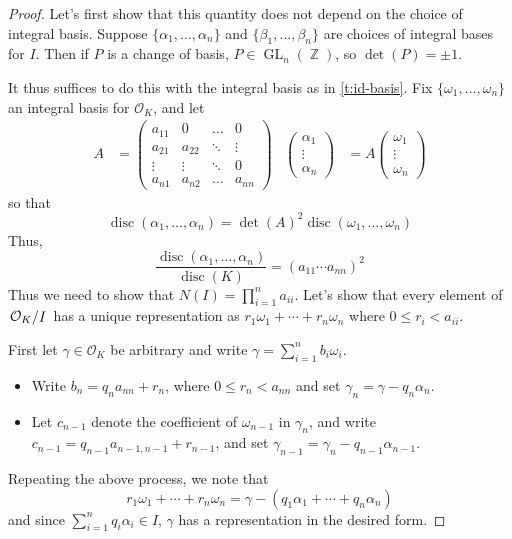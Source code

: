 \documentclass[11pt, a4paper]{memoir}
\DeclareMathOperator{\Z}{{\mathbb{Z}}}
\theoremstyle{change}
\theoremstyle{plain}
\theoremstyle{nonumberplain}
\newtheorem{proof}{Proof}
\DeclareMathOperator{\disc}{disc}
\DeclareMathOperator{\GL}{GL}
\newcommand{\quot}[2]{\mathchoice{\left.\raisebox{0.07em}{$#1$}\middle/\raisebox{-0.07em}{$#2$}\right.}
                                 {\left.\raisebox{0.03em}{$#1$}\middle/\raisebox{-0.03em}{$#2$}\right.}
                                 {\left.\raisebox{0.00em}{$#1$}\middle/\raisebox{-0.00em}{$#2$}\right.}
                                 {\left.\raisebox{0em}{$#1$}\middle/\raisebox{0em}{$#2$}\right.}}
\numberwithin{equation}{section}
\begin{document}
\begin{proof}
    Let's first show that this quantity does not depend on the choice of integral basis.
    Suppose $\{\alpha_1,\ldots,\alpha_n\}$ and $\{\beta_1,\ldots,\beta_n\}$ are choices of integral bases for $I$.
    Then if $P$ is a change of basis, $P\in\GL_n(\Z)$, so $\det(P)=\pm 1$.

    It thus suffices to do this with the integral basis as in \cref{t:id-basis}.
    Fix $\{\omega_1,\ldots,\omega_n\}$ an integral basis for $\mathcal{O}_K$, and let
    \begin{align*}
        A&=
        \begin{pmatrix}
            a_{11}&0&\hdots&0\\
            a_{21}&a_{22}&\ddots&\vdots\\
            \vdots&\vdots&\ddots&0\\
            a_{n1}&a_{n2}&\hdots&a_{nn}
        \end{pmatrix}
        &
        \begin{pmatrix}\alpha_1\\\vdots\\\alpha_n\end{pmatrix}&=A\begin{pmatrix}\omega_1\\\vdots\\\omega_n\end{pmatrix}
    \end{align*}
    so that
    \begin{equation*}
        \disc(\alpha_1,\ldots,\alpha_n) = \det(A)^2\disc(\omega_1,\ldots,\omega_n)
    \end{equation*}
    Thus,
    \begin{equation*}
        \frac{\disc(\alpha_1,\ldots,\alpha_n)}{\disc(K)}=(a_{11}\cdots a_{nn})^2
    \end{equation*}
    Thus we need to show that $N(I)=\prod_{i=1}^n a_{ii}$.
    Let's show that every element of $\quot{\mathcal{O}_K}{I}$ has a unique representation as $r_1\omega_1+\cdots+r_n\omega_n$ where $0\leq r_i<a_{ii}$.

    First let $\gamma\in\mathcal{O}_K$ be arbitrary and write $\gamma=\sum_{i=1}^n b_i\omega_i$.
    \begin{itemize}[nl]
        \item Write $b_n=q_na_{nn}+r_n$, where $0\leq r_n<a_{nn}$ and set $\gamma_n=\gamma-q_n\alpha_n$.
        \item Let $c_{n-1}$ denote the coefficient of $\omega_{n-1}$ in $\gamma_n$, and write $c_{n-1}=q_{n-1}a_{n-1,n-1}+r_{n-1}$, and set $\gamma_{n-1}=\gamma_n-q_{n-1}\alpha_{n-1}$.
    \end{itemize}
    Repeating the above process, we note that
    \begin{equation*}
        r_1\omega_1+\cdots+r_n\omega_n = \gamma-\left(q_1\alpha_1+\cdots+q_n\alpha_n\right)
    \end{equation*}
    and since $\sum_{i=1}^n q_i\alpha_i\in I$, $\gamma$ has a representation in the desired form.


\end{proof}
\end{document}
